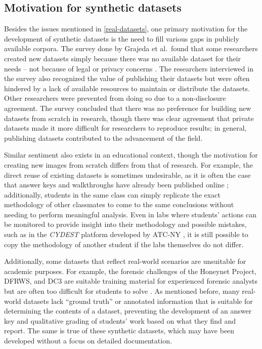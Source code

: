 \documentclass[letterpaper,12pt]{report}
\begin{document}
\subsection{Motivation for synthetic
datasets}\label{motivation-for-synthetic-datasets}

Besides the issues mentioned in \autoref{real-datasets}, one primary motivation for the development of synthetic
datasets is the need to fill various gaps in publicly available corpora.
The survey done by Grajeda et al.~found that some researchers created
new datasets simply because there was no available dataset for their
needs -- not because of legal or privacy concerns
\cite{grajedaAvailabilityDatasetsDigital2017}. The researchers
interviewed in the survey also recognized the value of publishing their
datasets but were often hindered by a lack of available resources to
maintain or distribute the datasets. Other researchers were prevented
from doing so due to a non-disclosure agreement. The survey concluded
that there was no preference for building new datasets from scratch in
research, though there was clear agreement that private datasets made it
more difficult for researchers to reproduce results; in general,
publishing datasets contributed to the advancement of the field.

Similar sentiment also exists in an educational context, though the
motivation for creating new images from scratch differs from that of
research. For example, the direct reuse of existing datasets is
sometimes undesirable, as it is often the case that answer keys and
walkthroughs have already been published online
\cite{woodsCreatingRealisticCorpora2011}; additionally, students in
the same class can simply replicate the exact methodology of other
classmates to come to the same conclusions without needing to perform
meaningful analysis. Even in labs where students' actions can be
monitored to provide insight into their methodology and possible
mistakes, such as in the \emph{CYDEST} platform developed by ATC-NY
\cite{bruecknerAutomatedComputerForensics2008}, it is still possible
to copy the methodology of another student if the labs themselves do not
differ.

Additionally, some datasets that reflect real-world scenarios are
unsuitable for academic purposes. For example, the forensic challenges
of the Honeynet Project, DFRWS, and DC3 are suitable training material
for experienced forensic analysts but are often too difficult for
students to solve \cite{woodsCreatingRealisticCorpora2011}. As
mentioned before, many real-world datasets lack ``ground truth'' or
annotated information that is suitable for determining the contents of a
dataset, preventing the development of an answer key and qualitative
grading of students' work based on what they find and report. The same
is true of these synthetic datasets, which may have been developed
without a focus on detailed documentation.
\end{document}
